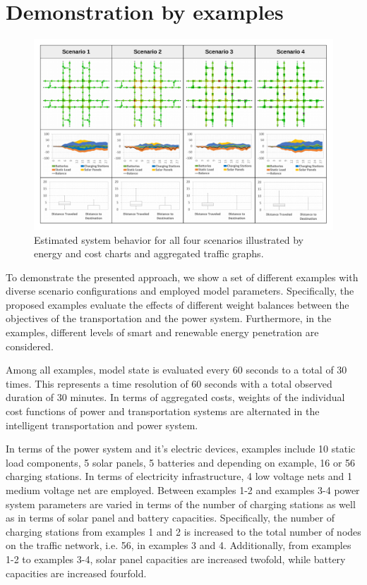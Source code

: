 \section{Demonstration by examples}
\label{section:evaluation}

\begin{figure}[b]
	\centering
	\includegraphics[width=\textwidth]{../gfx/examples2.pdf}
	\caption{Estimated system behavior for all four scenarios illustrated by energy and cost charts and aggregated traffic graphs.}
	\label{figure:examples}
\end{figure}

To demonstrate the presented approach, we show a set of different examples with diverse scenario configurations and employed model parameters. Specifically, the proposed examples evaluate the effects of different weight balances between the objectives of the transportation and the power system. 
Furthermore, in the examples, different levels of smart and renewable energy penetration are considered. 

Among all examples, model state is evaluated every 60 seconds to a total of 30 times. This represents a time resolution of 60 seconds with a total observed duration of 30 minutes. 
In terms of aggregated costs, weights of the individual cost functions of power and transportation systems are alternated in the intelligent transportation and power system.

In terms of the power system and it's electric devices, examples include 10 static load components, 5 solar panels, 5 batteries and depending on example, 16 or 56 charging stations. In terms of electricity infrastructure, 4 low voltage nets and 1 medium voltage net are employed. Between examples 1-2 and examples 3-4 power system parameters are varied in terms of the number of charging stations as well as in terms of solar panel and battery capacities. Specifically, the number of charging stations from examples 1 and 2 is increased to the total number of nodes on the traffic network, i.e. 56, in examples 3 and 4. Additionally, from examples 1-2 to examples 3-4, solar panel capacities are increased twofold, while battery capacities are increased fourfold. 

